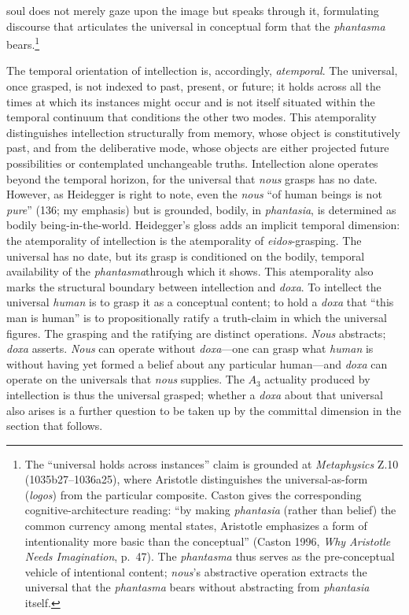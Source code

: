 \documentclass{article}
\begin{document}
soul does not merely gaze upon the image but speaks through it, formulating discourse that articulates the universal in conceptual form that the \textit{phantasma} bears.\footnote{The ``universal holds across instances'' claim is grounded at \textit{Metaphysics} Z.10 (1035b27--1036a25), where Aristotle distinguishes the universal-as-form (\textit{logos}) from the particular composite. Caston gives the corresponding cognitive-architecture reading: ``by making \textit{phantasia} (rather than belief) the common currency among mental states, Aristotle emphasizes a form of intentionality more basic than the conceptual'' (Caston 1996, \textit{Why Aristotle Needs Imagination}, p.~47). The \textit{phantasma} thus serves as the pre-conceptual vehicle of intentional content; \textit{nous}'s abstractive operation extracts the universal that the \textit{phantasma} bears without abstracting from \textit{phantasia} itself.} 

The temporal orientation of intellection is, accordingly, \textit{atemporal}. The universal, once grasped, is not indexed to past, present, or future; it holds across all the times at which its instances might occur and is not itself situated within the temporal continuum that conditions the other two modes. This atemporality distinguishes intellection structurally from memory, whose object is constitutively past, and from the deliberative mode, whose objects are either projected future possibilities or contemplated unchangeable truths. Intellection alone operates beyond the temporal horizon, for the universal that \textit{nous} grasps has no date. However, as Heidegger is right to note, even the \textit{nous} ``of human beings is not \textit{pure}'' (136; my emphasis) but is grounded, bodily, in \textit{phantasia}, is determined as bodily being-in-the-world. Heidegger's gloss adds an implicit temporal dimension: the atemporality of intellection is the atemporality of \textit{eidos}-grasping. The universal has no date, but its grasp is conditioned on the bodily, temporal availability of the \textit{phantasma}through which it shows. This atemporality also marks the structural boundary between intellection and \textit{doxa}. To intellect the universal \textit{human} is to grasp it as a conceptual content; to hold a \textit{doxa} that ``this man is human'' is to propositionally ratify a truth-claim in which the universal figures. The grasping and the ratifying are distinct operations. \textit{Nous} abstracts; \textit{doxa} asserts. \textit{Nous} can operate without \textit{doxa}---one can grasp what \textit{human} is without having yet formed a belief about any particular human---and \textit{doxa} can operate on the universals that \textit{nous} supplies. The $A_3$ actuality produced by intellection is thus the universal grasped; whether a \textit{doxa} about that universal also arises is a further question to be taken up by the committal dimension in the section that follows.
\end{document}

